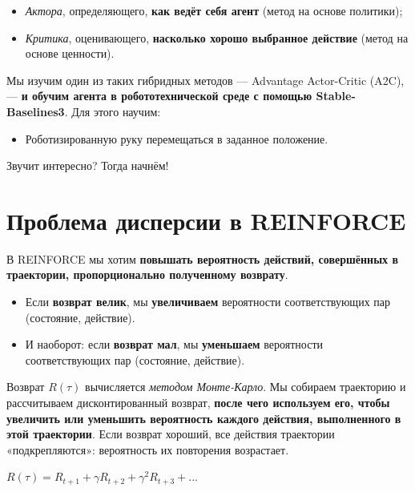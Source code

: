 \documentclass[11pt,a4paper]{article}
\begin{document}
\begin{itemize}
\tightlist
\item
  \emph{Актора}, определяющего, \textbf{как ведёт себя агент} (метод на основе политики);
\item
  \emph{Критика}, оценивающего, \textbf{насколько хорошо выбранное действие} (метод на основе ценности).
\end{itemize}

Мы изучим один из таких гибридных методов --- Advantage Actor-Critic (A2C), --- \textbf{и обучим агента в робототехнической среде с помощью Stable-Baselines3}. Для этого научим:

\begin{itemize}
\tightlist
\item
  Роботизированную руку перемещаться в заданное положение.
\end{itemize}

Звучит интересно? Тогда начнём!

\section{Проблема дисперсии в REINFORCE}\label{the-problem-of-variance-in-reinforce}

В REINFORCE мы хотим \textbf{повышать вероятность действий, совершённых в траектории, пропорционально полученному возврату}.


\begin{itemize}
\tightlist
\item
  Если \textbf{возврат велик}, мы \textbf{увеличиваем} вероятности соответствующих пар (состояние, действие).
\item
  И наоборот: если \textbf{возврат мал}, мы \textbf{уменьшаем} вероятности соответствующих пар (состояние, действие).
\end{itemize}

Возврат \(R(\tau)\) вычисляется \emph{методом Монте-Карло}. Мы собираем траекторию и рассчитываем дисконтированный возврат, \textbf{после чего используем его, чтобы увеличить или уменьшить вероятность каждого действия, выполненного в этой траектории}. Если возврат хороший, все действия траектории «подкрепляются»: вероятность их повторения возрастает.

\(R(\tau) = R_{t+1} + \gamma R_{t+2} + \gamma^2 R_{t+3} + ...\)
\end{document}
